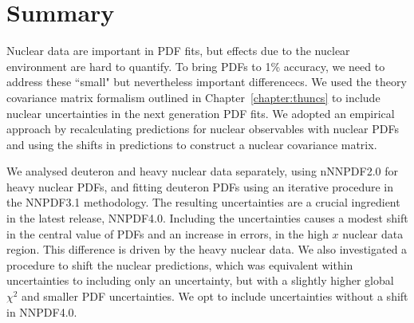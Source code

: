 \section{Summary}
Nuclear data are important in PDF fits, but effects due to the nuclear environment are hard to quantify. To bring PDFs to 1\% accuracy, we need  to address these ``small" but nevertheless important differencecs. We used the theory covariance matrix formalism outlined in Chapter~\ref{chapter:thuncs} to include nuclear uncertainties in the next generation PDF fits. We adopted an empirical approach by recalculating predictions for nuclear observables with nuclear PDFs and using the shifts in predictions to construct a nuclear covariance matrix. 

We analysed deuteron and heavy nuclear data separately, using nNNPDF2.0 for heavy nuclear PDFs, and fitting deuteron PDFs using an iterative procedure in the NNPDF3.1 methodology. The resulting uncertainties are a crucial ingredient in the latest release, NNPDF4.0. Including the uncertainties causes a modest shift in the central value of PDFs and an increase in errors, in the high $x$ nuclear data region. This difference is driven by the heavy nuclear data. We also investigated a procedure to shift the nuclear predictions, which was equivalent within uncertainties to including only an uncertainty, but with a slightly higher global $\chi^2$ and smaller PDF uncertainties. We opt to include uncertainties without a shift in NNPDF4.0.


\label{sec:summandoutlook}
